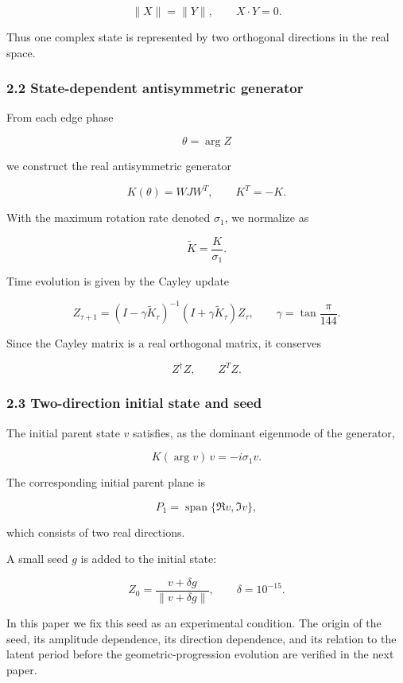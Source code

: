 \documentclass[
  a4paper,
]{article}
\begin{document}
\[
\|X\|=\|Y\|,
\qquad
X\cdot Y=0 .
\]

Thus one complex state is represented by two orthogonal directions in
the real space.

\subsubsection{2.2 State-dependent antisymmetric
generator}\label{state-dependent-antisymmetric-generator}

From each edge phase

\[
\theta=\arg Z
\]

we construct the real antisymmetric generator

\[
K(\theta)=WJW^T,
\qquad
K^T=-K .
\]

With the maximum rotation rate denoted \(\sigma_1\), we normalize as

\[
\widetilde K=\frac{K}{\sigma_1} .
\]

Time evolution is given by the Cayley update

\[
Z_{\tau+1}
=
\left(I-\gamma\widetilde K_\tau\right)^{-1}
\left(I+\gamma\widetilde K_\tau\right)Z_\tau,
\qquad
\gamma=\tan\frac{\pi}{144} .
\]

Since the Cayley matrix is a real orthogonal matrix, it conserves

\[
Z^\dagger Z,
\qquad
Z^T Z .
\]

\subsubsection{2.3 Two-direction initial state and
seed}\label{two-direction-initial-state-and-seed}

The initial parent state \(v\) satisfies, as the dominant eigenmode of
the generator,

\[
K(\arg v)\,v=-i\sigma_1 v .
\]

The corresponding initial parent plane is

\[
P_1=\operatorname{span}\{\Re v,\Im v\},
\]

which consists of two real directions.

A small seed \(g\) is added to the initial state:

\[
Z_0=\frac{v+\delta g}{\|v+\delta g\|},
\qquad
\delta=10^{-15} .
\]

In this paper we fix this seed as an experimental condition. The origin
of the seed, its amplitude dependence, its direction dependence, and its
relation to the latent period before the geometric-progression evolution
are verified in the next paper.
\end{document}
